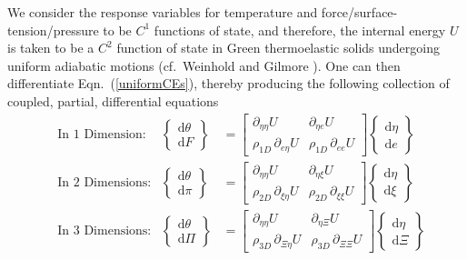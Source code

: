 We consider the response variables for temperature and force\slash surface-tension\slash pressure to be $C^1$ functions of state, and therefore, the internal energy $U$ is taken to be a $C^2$ function of state in Green thermo\-elastic solids undergoing uniform adiabatic motions (cf.\ Weinhold \cite{Weinhold75c} and Gilmore \cite{Gilmore84}).  One can then differentiate Eqn.~(\ref{uniformCEs}), thereby producing the following collection of coupled, partial, differential equations
\begin{subequations}
    \label{GreenElasticODEs}
    \begin{align}
    \mbox{} & \text{In 1 Dimension:} &
    \left\{ \begin{matrix} \mathrm{d} \theta \\ 
    \mathrm{d} F \end{matrix} \right\} & = \begin{bmatrix}
    \partial_{\eta\eta} U & \partial_{\eta e} U \\
    \rho_{1D} \, \partial_{e \eta} U & \rho_{1D} \, \partial_{ee} U \end{bmatrix} 
    \left\{ \begin{matrix} \mathrm{d} \eta \\
    \mathrm{d} e \end{matrix} \right\} \\
    \mbox{} & \text{In 2 Dimensions:} &
    \left\{ \begin{matrix} \mathrm{d} \theta \\ 
    \mathrm{d} \pi \end{matrix} \right\} & = \begin{bmatrix}
    \partial_{\eta\eta} U & \partial_{\eta \xi} U \\
    \rho_{2D} \, \partial_{\xi\eta} U & \rho_{2D} \, \partial_{\xi\xi} U \end{bmatrix} \left\{ \begin{matrix} \mathrm{d} \eta \\
    \mathrm{d} \xi \end{matrix} \right\} \label{GreenMembrane} \\
    \mbox{} & \text{In 3 Dimensions:} &
    \left\{ \begin{matrix} \mathrm{d} \theta \\ 
    \mathrm{d} \Pi \end{matrix} \right\} & = \begin{bmatrix}
    \partial_{\eta\eta} U & \partial_{\eta\Xi} U \\
    \rho_{3D} \, \partial_{\Xi \eta} U & \rho_{3D} \, \partial_{\Xi\Xi} U \end{bmatrix} \left\{ \begin{matrix} \mathrm{d} \eta \\
    \mathrm{d} \Xi \end{matrix} \right\} \label{GreenSolid}
    \end{align}
\end{subequations}
